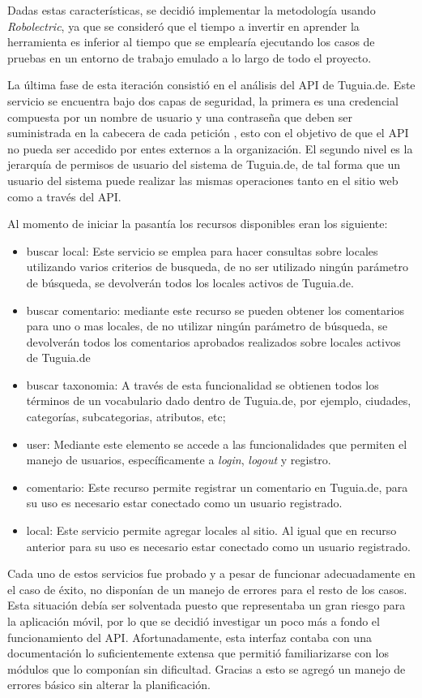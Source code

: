 Dadas estas características, se decidió implementar la metodología usando \textit{Robolectric}, ya que se consideró que el tiempo a invertir en aprender la herramienta es inferior al tiempo que se emplearía ejecutando los casos de pruebas en un entorno de trabajo emulado a lo largo de todo el proyecto.

La última fase de esta iteración consistió en el análisis del API de Tuguia.de. Este servicio se encuentra bajo dos capas de seguridad, la primera es una credencial compuesta por un nombre de usuario y una contraseña que deben ser suministrada en la cabecera de cada petición , esto con el objetivo de que el API no pueda ser accedido  por entes externos a la organización. El segundo nivel es la jerarquía de permisos de usuario del sistema de Tuguia.de, de tal forma que un usuario del sistema puede realizar las mismas operaciones tanto en el sitio web como a través del API. 

Al momento de iniciar la pasantía los recursos disponibles eran los siguiente:
\begin{itemize}
\item buscar local: Este servicio se emplea para hacer consultas sobre locales utilizando varios criterios de busqueda, de no ser utilizado ningún parámetro de búsqueda, se devolverán todos los locales activos de Tuguia.de.
\item buscar comentario: mediante este recurso se pueden obtener los comentarios para uno o mas locales, de no utilizar ningún parámetro de búsqueda, se devolverán todos los comentarios aprobados realizados sobre locales activos de Tuguia.de
\item buscar taxonomia: A través de esta funcionalidad se obtienen todos los términos de un vocabulario dado dentro de Tuguia.de, por ejemplo, ciudades, categorías, subcategorias, atributos, etc;
\item user: Mediante este elemento se accede a las funcionalidades que permiten el manejo de usuarios, específicamente a \textit{login}, \textit{logout} y registro.
\item comentario: Este recurso permite registrar un comentario en Tuguia.de, para su uso es necesario estar conectado como un usuario registrado.
\item local: Este servicio permite agregar locales al sitio. Al igual que en recurso anterior para su uso es necesario estar conectado como un usuario registrado.
\end{itemize}

Cada uno de estos servicios fue probado y a pesar de funcionar adecuadamente en el caso de éxito, no disponían de un manejo de errores para el resto de los casos. Esta situación debía ser solventada puesto que representaba un gran riesgo para la aplicación móvil, por lo que se decidió investigar un poco más a fondo el funcionamiento del API. Afortunadamente, esta interfaz contaba con una documentación lo suficientemente extensa que permitió familiarizarse con los módulos que lo componían sin dificultad. Gracias a esto se agregó un manejo de errores básico sin alterar la planificación.

